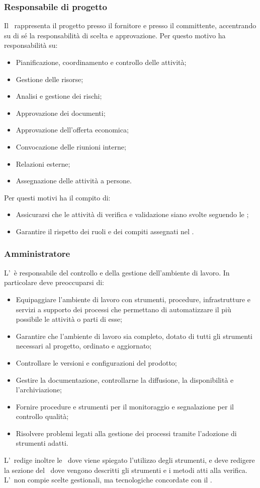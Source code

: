 \documentclass[../NormeProgetto.tex]{subfiles}
\begin{document}
		\subsubsection{Responsabile di progetto}
			Il \responsabilediprogetto\ rappresenta il progetto presso il fornitore e presso il committente, accentrando su di sé la responsabilità di scelta e approvazione. Per questo motivo ha responsabilità su:
			\begin{itemize}
				\item Pianificazione, coordinamento e controllo delle attività;
				\item Gestione delle risorse;
				\item Analisi e gestione dei rischi;
				\item Approvazione dei documenti;
				\item Approvazione dell'offerta economica;
				\item Convocazione delle riunioni interne;
				\item Relazioni esterne;
				\item Assegnazione delle attività a persone.
			\end{itemize}
			Per questi motivi ha il compito di:
			\begin{itemize}
				\item Assicurarsi che le attività di verifica e validazione siano svolte seguendo le \normediprogetto;
				\item Garantire il rispetto dei ruoli e dei compiti assegnati nel \pianodiprogetto.
			\end{itemize}
		\subsubsection{Amministratore}
			L'\amministratore\ è responsabile del controllo e della gestione dell'ambiente di lavoro. In particolare deve preoccuparsi di:
			\begin{itemize}
				\item Equipaggiare l'ambiente di lavoro con strumenti, procedure, infrastrutture e servizi a supporto dei processi che permettano di automatizzare il più possibile le attività o parti di esse;
				\item Garantire che l'ambiente di lavoro sia completo, dotato di tutti gli strumenti necessari al progetto, ordinato e aggiornato;
				\item Controllare le versioni e configurazioni del prodotto\g;
				\item Gestire la documentazione, controllarne la diffusione, la disponibilità e l'archiviazione;
				\item Fornire procedure e strumenti per il monitoraggio e segnalazione per il controllo qualità;
				\item Risolvere problemi legati alla gestione dei processi tramite l'adozione di strumenti adatti.
			\end{itemize}
			L'\amministratore\ redige inoltre le \normediprogetto\, dove viene spiegato l'utilizzo degli strumenti, e deve redigere la sezione del \pianodiqualifica\ dove vengono descritti gli strumenti e i metodi atti alla verifica. L'\amministratore\ non compie scelte gestionali, ma tecnologiche concordate con il \responsabilediprogetto.
\end{document}
